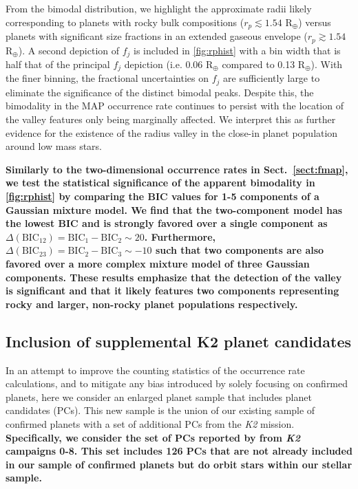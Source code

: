\documentclass[twocolumn]{emulateapj}
\newcommand{\ktwo}[1]{\emph{K2}#1}
\begin{document}
From the bimodal distribution, we highlight the approximate radii likely corresponding to planets with rocky
bulk compositions ($r_p\lesssim 1.54$ R$_{\oplus}$) versus planets with significant size fractions in an extended
gaseous envelope ($r_p\gtrsim 1.54$ R$_{\oplus}$).
A second depiction of $f_j$ is included in \autoref{fig:rphist} with a bin width that is half that of the principal
$f_j$ depiction (i.e. 0.06 R$_{\oplus}$ compared to 0.13 R$_{\oplus}$).
With the finer binning, the fractional uncertainties on $f_j$ are sufficiently
large to eliminate the significance of the distinct bimodal peaks. Despite this, the bimodality in the MAP
occurrence rate continues to persist with the location of the valley features only being marginally affected.
We interpret this as further evidence for the existence of the radius valley in the close-in planet population
around low mass stars.


\textbf{Similarly to the two-dimensional occurrence rates in Sect.~\ref{sect:fmap}, we test the statistical significance
of the apparent bimodality in \autoref{fig:rphist} by comparing the BIC values for 1-5 components of a Gaussian
mixture model. We find that the two-component model has the lowest BIC and is strongly favored over a single
component as $\Delta(\text{BIC}_{12})=\text{BIC}_1-\text{BIC}_2 \sim 20$. Furthermore, 
$\Delta(\text{BIC}_{23})=\text{BIC}_2-\text{BIC}_3 \sim -10$ such that two components are also favored over
a more complex mixture model of three Gaussian components. These results emphasize
that the detection of the valley is significant and that it likely features two components representing
rocky and larger, non-rocky planet populations respectively.}


\subsection{Inclusion of supplemental K2 planet candidates}
In an attempt to improve the counting statistics of the occurrence rate calculations, and to
mitigate any bias introduced by solely focusing on confirmed planets, here
we consider an enlarged planet sample that includes planet candidates (PCs). 
This new sample is the union of our existing sample of confirmed planets
with a set of additional PCs from the \ktwo{}
mission. \textbf{Specifically, we consider the set of PCs reported by \cite{kruse19}
from \ktwo{} campaigns 0-8. This set includes 126 PCs that are not already included in our sample of confirmed
planets but do orbit stars within our stellar sample.}
\end{document}
